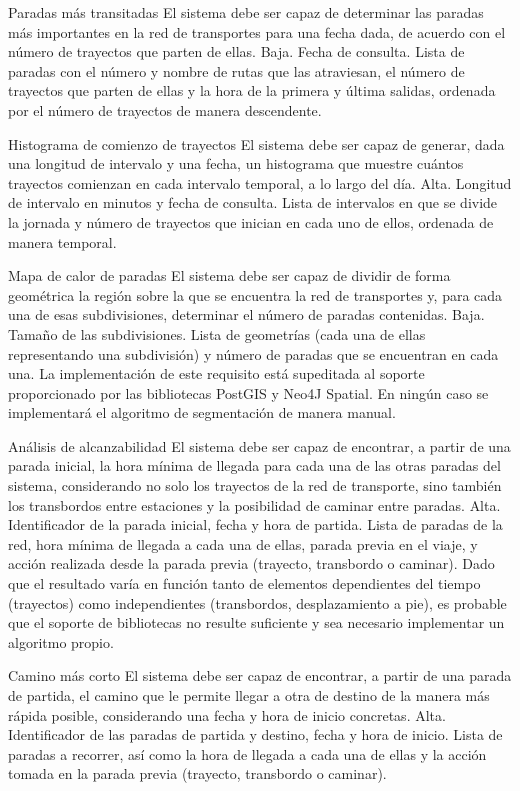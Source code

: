 \freq
    {Paradas más transitadas}
    {El sistema debe ser capaz de determinar las paradas más importantes en la red de transportes para una fecha dada, de acuerdo con el número de trayectos que parten de ellas.}
    {Baja.}
    {Fecha de consulta.}
    {Lista de paradas con el número y nombre de rutas que las atraviesan, el número de trayectos que parten de ellas y la hora de la primera y última salidas, ordenada por el número de trayectos de manera descendente.}
    {}

\freq
    {Histograma de comienzo de trayectos}
    {El sistema debe ser capaz de generar, dada una longitud de intervalo y una fecha, un histograma que muestre cuántos trayectos comienzan en cada intervalo temporal, a lo largo del día.}
    {Alta.}
    {Longitud de intervalo en minutos y fecha de consulta.}
    {Lista de intervalos en que se divide la jornada y número de trayectos que inician en cada uno de ellos, ordenada de manera temporal.}
    {}

\freq
    {Mapa de calor de paradas}
    {El sistema debe ser capaz de dividir de forma geométrica la región sobre la que se encuentra la red de transportes y, para cada una de esas subdivisiones, determinar el número de paradas contenidas.}
    {Baja.}
    {Tamaño de las subdivisiones.}
    {Lista de geometrías (cada una de ellas representando una subdivisión) y número de paradas que se encuentran en cada una.}
    {La implementación de este requisito está supeditada al soporte proporcionado por las bibliotecas PostGIS y Neo4J Spatial. En ningún caso se implementará el algoritmo de segmentación de manera manual.}

\freq
    {Análisis de alcanzabilidad}
    {El sistema debe ser capaz de encontrar, a partir de una parada inicial, la hora mínima de llegada para cada una de las otras paradas del sistema, considerando no solo los trayectos de la red de transporte, sino también los transbordos entre estaciones y la posibilidad de caminar entre paradas.}
    {Alta.}
    {Identificador de la parada inicial, fecha y hora de partida.}
    {Lista de paradas de la red, hora mínima de llegada a cada una de ellas, parada previa en el viaje, y acción realizada desde la parada previa (trayecto, transbordo o caminar).}
    {Dado que el resultado varía en función tanto de elementos dependientes del tiempo (trayectos) como independientes (transbordos, desplazamiento a pie), es probable que el soporte de bibliotecas no resulte suficiente y sea necesario implementar un algoritmo propio.}

\freq
    {Camino más corto}
    {El sistema debe ser capaz de encontrar, a partir de una parada de partida, el camino que le permite llegar a otra de destino de la manera más rápida posible, considerando una fecha y hora de inicio concretas.}
    {Alta.}
    {Identificador de las paradas de partida y destino, fecha y hora de inicio.}
    {Lista de paradas a recorrer, así como la hora de llegada a cada una de ellas y la acción tomada en la parada previa (trayecto, transbordo o caminar).}
    {}

